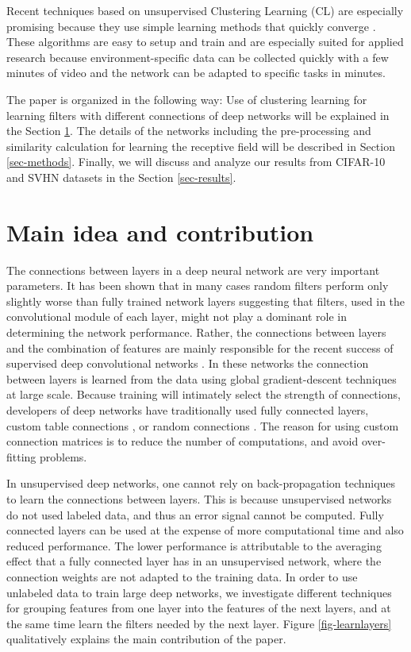 \documentclass{article} %
\begin{document}
Recent techniques based on unsupervised Clustering Learning (CL) are especially promising because they use 
simple learning methods that quickly converge \cite{culurciello2013clustering,coates_analysis_2011}. These 
algorithms are easy to setup and train and are especially suited for applied research because environment-specific data 
can be collected quickly with a few minutes of video and the network can be adapted to specific tasks in minutes.

The paper is organized in the following way: 
Use of clustering learning for learning filters with different connections of deep networks will be explained in the Section \ref{sec-main}. 
The details of the networks including the pre-processing and similarity calculation for learning the receptive field will be described in Section \ref{sec-methods}. 
Finally, we will discuss and analyze our results from CIFAR-10 and SVHN datasets in the Section \ref{sec-results}. 


\section{Main idea and contribution}
\label{sec-main}

The connections between layers in a deep neural network are very important parameters. It has been shown that in 
many cases random filters perform only slightly worse than fully trained network layers \cite{saxe2011random} suggesting
that filters, used in the convolutional module of each layer, might not play a dominant role in determining the network performance.
Rather, the connections between layers and the combination of features are mainly responsible for the recent success of 
supervised deep convolutional networks \cite{krizhevsky_imagenet_2012}. In these networks the connection between layers is
learned from the data using global gradient-descent techniques at large scale. Because training will intimately select the strength of connections, 
developers of deep networks have traditionally used fully connected layers, custom table connections \cite{lecun_gradient-based_1998}, or 
random connections \cite{lecun_convolutional_2010}. The reason for using custom connection matrices 
is to reduce the number of computations, and avoid over-fitting problems.
 
In unsupervised deep networks, one cannot rely on back-propagation techniques to learn the connections between layers. 
This is because unsupervised networks do not used labeled data, and thus an error signal cannot be computed. 
Fully connected layers can be used \cite{culurciello2013clustering,coates_analysis_2011} at the expense of more computational time
and also reduced performance. The lower performance is attributable to the averaging effect that a fully connected layer has in an 
unsupervised network, where the connection weights are not adapted to the training data. In order to use unlabeled data to train 
large deep networks, we investigate different techniques for grouping features from one layer into the features of the next layers, 
and at the same time learn the filters needed by the next layer. Figure \ref{fig-learnlayers} qualitatively explains the main contribution of the paper.
\end{document}
